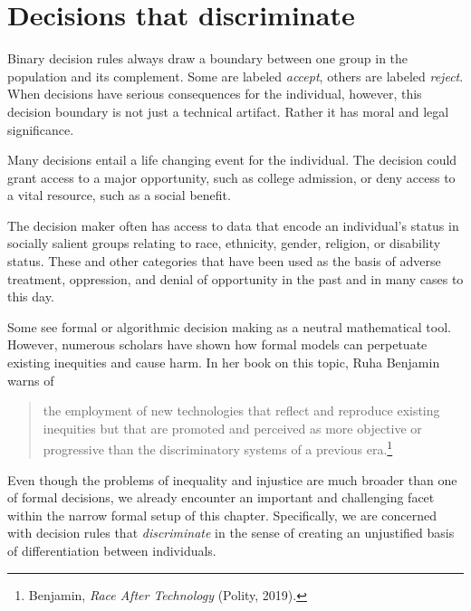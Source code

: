 \documentclass{tufte-book}
\begin{document}
\hypertarget{decisions-that-discriminate}{%
\section{Decisions that
discriminate}\label{decisions-that-discriminate}}

Binary decision rules always draw a boundary between one group in the
population and its complement. Some are labeled \emph{accept}, others
are labeled \emph{reject}. When decisions have serious consequences for
the individual, however, this decision boundary is not just a technical
artifact. Rather it has moral and legal significance.

Many decisions entail a life changing event for the individual. The
decision could grant access to a major opportunity, such as college
admission, or deny access to a vital resource, such as a social benefit.

The decision maker often has access to data that encode an individual's
status in socially salient groups relating to race, ethnicity, gender,
religion, or disability status. These and other categories that have
been used as the basis of adverse treatment, oppression, and denial of
opportunity in the past and in many cases to this day.

Some see formal or algorithmic decision making as a neutral mathematical
tool. However, numerous scholars have shown how formal models can
perpetuate existing inequities and cause harm. In her book on this
topic, Ruha Benjamin warns of

\begin{quote}
the employment of new technologies that reflect and reproduce existing
inequities but that are promoted and perceived as more objective or
progressive than the discriminatory systems of a previous
era.\footnote{Benjamin, \emph{Race After Technology} (Polity, 2019).}
\end{quote}

Even though the problems of inequality and injustice are much broader
than one of formal decisions, we already encounter an important and
challenging facet within the narrow formal setup of this chapter.
Specifically, we are concerned with decision rules that
\emph{discriminate} in the sense of creating an unjustified basis of
differentiation between individuals.
\end{document}
